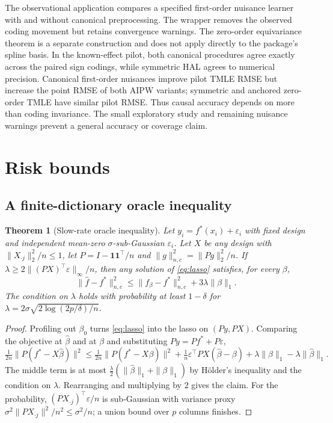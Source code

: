 \documentclass[11pt]{article}
\newtheorem{theorem}{Theorem}
\theoremstyle{definition}
\theoremstyle{remark}
\newcommand{\one}{\mathbf{1}}
\begin{document}
The observational application compares a specified first-order nuisance
learner with and without canonical preprocessing. The wrapper removes the
observed coding movement but retains convergence warnings. The zero-order
equivariance theorem is a separate construction and does not apply directly
to the package's spline basis. In the known-effect pilot, both canonical
procedures agree exactly across the paired sign codings, while symmetric
HAL agrees to numerical precision. Canonical first-order nuisances improve
pilot TMLE RMSE but increase the point RMSE of both AIPW variants; symmetric
and anchored zero-order TMLE have similar pilot RMSE. Thus causal accuracy
depends on more than coding invariance. The small exploratory study and
remaining nuisance warnings prevent a general accuracy or coverage claim.

\clearpage
\appendix
\section{Risk bounds}\label{sec:rates}

\subsection{A finite-dictionary oracle inequality}

\begin{theorem}[Slow-rate oracle inequality]\label{thm:oracle}
Let $y_i = f^*(x_i) + \varepsilon_i$ with fixed design and independent
mean-zero $\sigma$-sub-Gaussian $\varepsilon_i$. Let $X$ be any design with
$\|X_{\cdot j}\|_2^2 / n \le 1$, let $P = I - \one\one^\top/n$ and
$\|g\|_{n,c}^2 = \|Pg\|_2^2/n$. If
$\lambda \ge 2 \|(PX)^\top \varepsilon\|_\infty / n$, then any solution of
\eqref{eq:lasso} satisfies, for every $\beta$,
\[
  \|\hat f - f^*\|_{n,c}^2 \le \|f_\beta - f^*\|_{n,c}^2 + 3\lambda\|\beta\|_1 .
\]
The condition on $\lambda$ holds with probability at least $1-\delta$ for
$\lambda = 2\sigma\sqrt{2\log(2p/\delta)/n}$.
\end{theorem}

\begin{proof}
Profiling out $\beta_0$ turns \eqref{eq:lasso} into the lasso on $(Py, PX)$.
Comparing the objective at $\hat\beta$ and at $\beta$ and substituting
$Py = Pf^* + P\varepsilon$,
\[
  \tfrac{1}{2n}\|P(f^* - X\hat\beta)\|^2 \le
  \tfrac{1}{2n}\|P(f^* - X\beta)\|^2
  + \tfrac{1}{n}\varepsilon^\top PX(\hat\beta - \beta)
  + \lambda\|\beta\|_1 - \lambda\|\hat\beta\|_1 .
\]
The middle term is at most
$\tfrac{\lambda}{2}(\|\hat\beta\|_1 + \|\beta\|_1)$ by H\"older's inequality
and the condition on $\lambda$. Rearranging and multiplying by $2$ gives the
claim. For the probability, $(PX_{\cdot j})^\top\varepsilon / n$ is
sub-Gaussian with variance proxy $\sigma^2 \|PX_{\cdot j}\|^2/n^2 \le
\sigma^2/n$; a union bound over $p$ columns finishes.
\end{proof}
\end{document}
